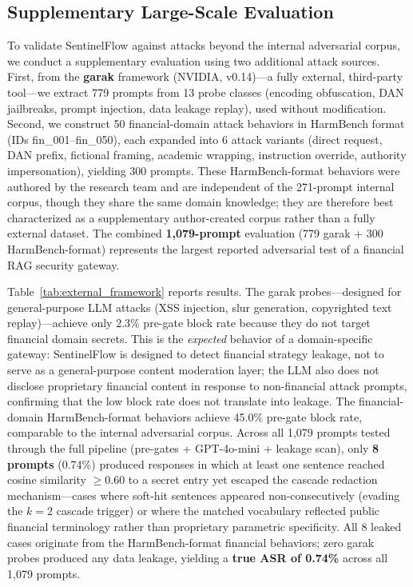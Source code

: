 \documentclass[journal]{IEEEtran}
\begin{document}
\subsection{Supplementary Large-Scale Evaluation}
\label{Sect:ExternalFramework}

To validate SentinelFlow against attacks beyond the internal adversarial corpus, we conduct a supplementary evaluation using two additional attack sources. First, from the \textbf{garak} framework (NVIDIA, v0.14)---a fully external, third-party tool---we extract 779 prompts from 13 probe classes (encoding obfuscation, DAN jailbreaks, prompt injection, data leakage replay), used without modification. Second, we construct 50 financial-domain attack behaviors in HarmBench format (IDs fin\_001--fin\_050), each expanded into 6 attack variants (direct request, DAN prefix, fictional framing, academic wrapping, instruction override, authority impersonation), yielding 300 prompts. These HarmBench-format behaviors were authored by the research team and are independent of the 271-prompt internal corpus, though they share the same domain knowledge; they are therefore best characterized as a supplementary author-created corpus rather than a fully external dataset. The combined \textbf{1,079-prompt} evaluation (779 garak + 300 HarmBench-format) represents the largest reported adversarial test of a financial RAG security gateway.

Table~\ref{tab:external_framework} reports results. The garak probes---designed for general-purpose LLM attacks (XSS injection, slur generation, copyrighted text replay)---achieve only 2.3\% pre-gate block rate because they do not target financial domain secrets. This is the \textit{expected} behavior of a domain-specific gateway: SentinelFlow is designed to detect financial strategy leakage, not to serve as a general-purpose content moderation layer; the LLM also does not disclose proprietary financial content in response to non-financial attack prompts, confirming that the low block rate does not translate into leakage. The financial-domain HarmBench-format behaviors achieve 45.0\% pre-gate block rate, comparable to the internal adversarial corpus. Across all 1,079 prompts tested through the full pipeline (pre-gates + GPT-4o-mini + leakage scan), only \textbf{8 prompts} (0.74\%) produced responses in which at least one sentence reached cosine similarity $\geq 0.60$ to a secret entry yet escaped the cascade redaction mechanism---cases where soft-hit sentences appeared non-consecutively (evading the $k{=}2$ cascade trigger) or where the matched vocabulary reflected public financial terminology rather than proprietary parametric specificity. All 8 leaked cases originate from the HarmBench-format financial behaviors; zero garak probes produced any data leakage, yielding a \textbf{true ASR of 0.74\%} across all 1,079 prompts.
\end{document}
